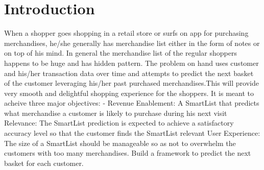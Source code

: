 \section{Introduction}
When a shopper goes shopping in a retail store or surfs on app for purchasing merchandises, 
he/she generally has merchandise list either in the form of notes or on top of his mind. 
In general the merchandise list of the regular shoppers happens to be huge and has hidden pattern. 
The problem on hand uses customer and his/her transaction data over time and attempts to predict 
the next basket of the customer leveraging his/her past purchased merchandises.This will provide 
very smooth and delightful shopping experience for the shoppers. It is meant to acheive three major 
objectives: - Revenue Enablement: A SmartList that predicts what merchandise a customer is likely to 
purchase during his next visit Relevance: The SmartList prediction is expected to achieve a 
satisfactory accuracy level so that the customer finds the SmartList relevant User Experience: 
The size of a SmartList should be manageable so as not to overwhelm the customers with too many 
merchandises. Build a framework to predict the next basket for each customer.